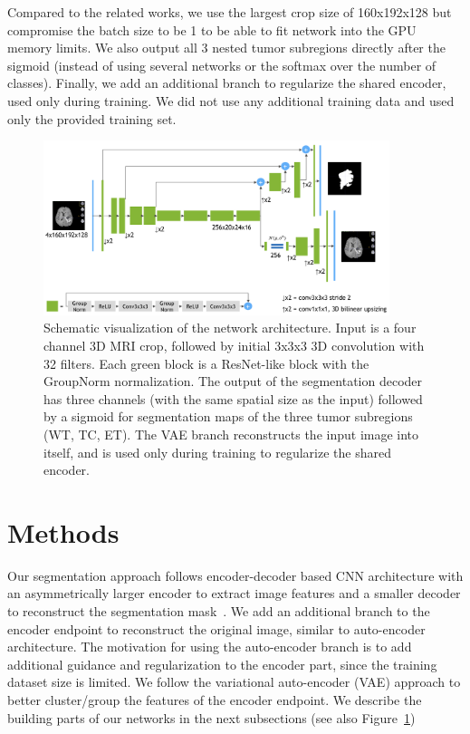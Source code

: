 \documentclass[runningheads]{llncs}
\begin{document}
Compared to the related works,  we use the largest crop size of 160x192x128 but compromise the batch size to be 1 to be able to fit network into the GPU memory limits. We also output all 3 nested tumor subregions  directly after the sigmoid (instead of using several networks or the softmax over the number of classes). Finally, we add an additional branch to regularize the shared encoder, used only during training. We did not use any additional training data and used only the provided training set. 

 \begin{figure}[h] 
	\centering
	\includegraphics[clip=true, trim=0pt 0pt 0pt 0pt, width=0.9\textwidth]{network.png}
	\caption{Schematic visualization of the network architecture.  Input is a four channel 3D MRI crop, followed by initial 3x3x3 3D convolution with 32 filters. Each green block is a ResNet-like block with the GroupNorm normalization. The output of the segmentation decoder has three channels (with the same spatial size as the input) followed by a sigmoid for segmentation maps of the three tumor subregions (WT, TC, ET).  The VAE branch reconstructs the input image into itself, and is used only during training to regularize the shared encoder.}
	\label{fig:network}
	\vspace{-5mm}
\end{figure}

\section{Methods}
\label{sec:methods}

Our segmentation approach follows encoder-decoder based CNN architecture with an asymmetrically larger encoder to extract image features and a smaller decoder to reconstruct the segmentation mask~\cite{deeplabv3plus2018,deeplabv3plus2017,he2017maskrcnn,Ronneberger15,Milletari16}.  We add an additional branch to the encoder endpoint to reconstruct the original image, similar to auto-encoder architecture.  The motivation for using the auto-encoder branch is to  add additional guidance and regularization to the encoder part, since the training dataset size is limited.  We follow the variational auto-encoder (VAE) approach to better cluster/group the features of the encoder endpoint. We  describe the building parts of our networks in the next subsections (see also Figure~\ref{fig:network})
\end{document}
